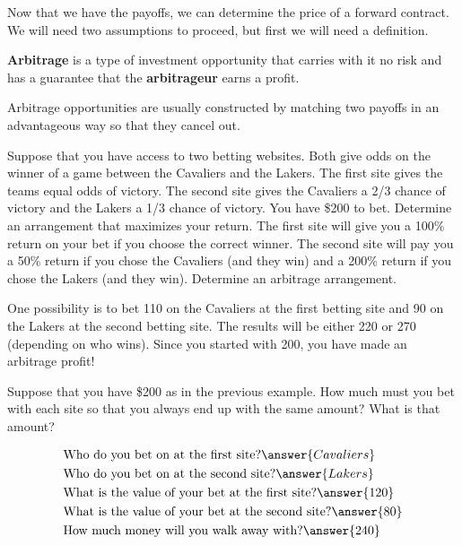 \documentclass{ximera}
\begin{document}
Now that we have the payoffs, we can determine the price of a forward contract. We will need two assumptions to proceed, but first we will need a definition.

\begin{definition}\label{def22}
{\bf Arbitrage} is a type of investment opportunity that carries with it no risk and has a guarantee that the {\bf arbitrageur} earns a profit. 
\end{definition}

Arbitrage opportunities are usually constructed by matching two payoffs in an advantageous way so that they cancel out. 

\begin{example}
Suppose that you have access to two betting websites. Both give odds on the winner of a game between the Cavaliers and the Lakers. The first site gives the teams equal odds of victory. The second site gives the Cavaliers a 2/3 chance of victory and the Lakers a 1/3 chance of victory. You have \$200 to bet. Determine an arrangement that maximizes your return. The first site will give you a 100\% return on your bet if you choose the correct winner. The second site will pay you a 50\% return if you chose the Cavaliers (and they win) and a 200\% return if you chose the Lakers (and they win). Determine an arbitrage arrangement.
\end{example}

\begin{solution}
One possibility is to bet 110 on the Cavaliers at the first betting site and 90 on the Lakers at the second betting site. The results will be either 220 or 270 (depending on who wins). Since you started with 200, you have made an arbitrage profit!
\end{solution}

\begin{question} Suppose that you have \$200 as in the previous example. How much must you bet with each site so that you always end up with the same amount? What is that amount?
	\begin{prompt}
		\begin{align*}
		&\text{Who do you bet on at the first site?}\answer{Cavaliers}\\
		&\text{Who do you bet on at the second site?}\answer{Lakers}\\
		&\text{What is the value of your bet at the first site?}\answer{120}\\
		&\text{What is the value of your bet at the second site?}\answer{80}\\
		&\text{How much money will you walk away with?}\answer{240}
		\end{align*}
	\end{prompt}
\end{question}
\end{document}

